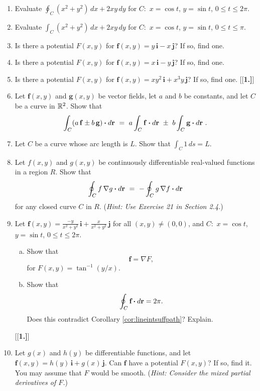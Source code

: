 \begin{enumerate}[\bfseries 1.]
 \item Evaluate $\displaystyle\oint_C (x^2 + y^2 )\,dx + 2xy\,dy$ for $C:$ $x=\cos t$, $y=\sin t$, $0\le t\le 2\pi$.
 \item Evaluate $\displaystyle\int_C (x^2 + y^2 )\,dx + 2xy\,dy$ for $C:$ $x=\cos t$, $y=\sin t$, $0\le t\le \pi$.
 \item Is there a potential $F(x,y)$ for $\mathbf{f}(x,y) = y\,\mathbf{i} - x\,\mathbf{j}$? If so, find one.
 \item Is there a potential $F(x,y)$ for $\mathbf{f}(x,y) = x\,\mathbf{i} - y\,\mathbf{j}$? If so, find one.
 \item Is there a potential $F(x,y)$ for $\mathbf{f}(x,y) = xy^2\,\mathbf{i} + x^3 y\,\mathbf{j}$? If so, find
  one.
[{[\bfseries 1.]}]
 \item Let $\mathbf{f}(x,y)$ and $\mathbf{g}(x,y)$ be vector fields, let $a$ and $b$ be constants, and let $C$ be
  a curve in $\mathbb{R}^{2}$. Show that
  \begin{displaymath}
   \int_{C}(a\,\mathbf{f} \pm b\,\mathbf{g}) \bm{\cdot} d\mathbf{r} ~=~ a \int_{C}\mathbf{f} \bm{\cdot} d\mathbf{r} ~\pm~
   b \int_{C}\mathbf{g} \bm{\cdot} d\mathbf{r} ~.
  \end{displaymath}
 \item Let $C$ be a curve whose arc length is $L$. Show that $\int_C 1\,ds = L$.
 \item Let $f(x,y)$ and $g(x,y)$ be continuously differentiable real-valued functions in a region $R$. Show that
  \begin{displaymath}
   \oint_{C}f\,\nabla g \bm{\cdot} d\mathbf{r} ~=~ -\oint_{C}g\,\nabla f \bm{\cdot} d\mathbf{r}
  \end{displaymath}
  for any closed curve $C$ in $R$. (\emph{Hint: Use Exercise 21 in Section 2.4.})
 \item Let $\mathbf{f}(x,y)=\frac{-y}{x^2 + y^2}\,\mathbf{i} + \frac{x}{x^2 + y^2}\,\mathbf{j}$ for all $(x,y)\ne(0,0)$,
  and $C:$ $x=\cos t$, $y=\sin t$, $0\le t\le 2\pi$.
  \begin{enumerate}[(a)]
   \item Show that \[\mathbf{f} = \nabla F,\] for $F(x,y) = \tan^{-1}(y/x)$.
   \item Show that \[\oint_{C} \textbf{f} \bm{\cdot} d\textbf{r} = 2\pi.\] Does this contradict Corollary
    \ref{cor:lineintsuffpath}? Explain.
  \end{enumerate}
[{[\bfseries 1.]}]
 \item Let $g(x)$ and $h(y)$ be differentiable functions, and let $\mathbf{f}(x,y)=h(y)\,\mathbf{i} + g(x)\,\mathbf{j}$.
  Can $\mathbf{f}$ have a potential $F(x,y)$? If so, find it. You may assume that $F$ would be smooth. (\emph{Hint:
  Consider the mixed partial derivatives of $F$.})
\end{enumerate}
\newpage
